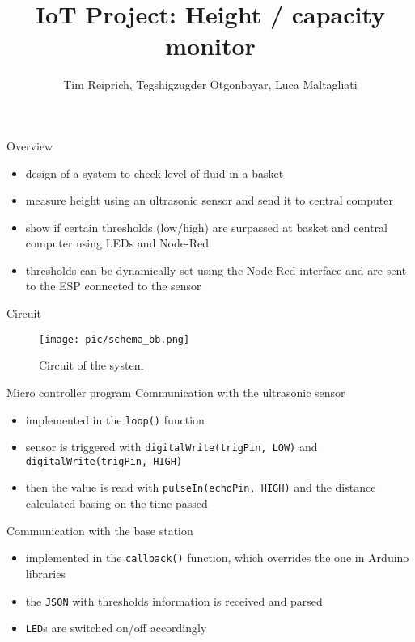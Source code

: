 \documentclass[11pt]{beamer}
\author{Tim Reiprich, Tegshigzugder Otgonbayar, Luca Maltagliati}
\title{IoT Project: Height / capacity monitor}
\begin{document}
\begin{frame}
\titlepage
\end{frame}



\begin{frame}{Overview}
\begin{itemize}
\item design of a system to check level of fluid in a basket
\item measure height using an ultrasonic sensor and send it to central computer
\item show if certain thresholds (low/high) are surpassed at basket and central computer using LEDs and Node-Red
\item thresholds can be dynamically set using the Node-Red interface and are sent to the ESP connected to the sensor
\end{itemize}
\end{frame}

\begin{frame}{Circuit}
\begin{figure}
\hspace*{-0.5cm}\texttt{[image: pic/schema\_bb.png]}
\caption{Circuit of the system}
\label{schema_bb}
\end{figure}
\end{frame}

\begin{frame}{Micro controller program}
  Communication with the ultrasonic sensor
  \begin{itemize}
  \item implemented in the \texttt{loop()} function
  \item sensor is triggered with \texttt{digitalWrite(trigPin, LOW)} and
    \texttt{digitalWrite(trigPin, HIGH)}
  \item then the value is read with \texttt{pulseIn(echoPin, HIGH)} and the distance
    calculated basing on the time passed
  \end{itemize}
  Communication with the base station
  \begin{itemize}
    \item implemented in the \texttt{callback()} function, which overrides the
      one in Arduino libraries
    \item the \texttt{JSON} with thresholds information is received and parsed
    \item \texttt{LED}s are switched on/off accordingly
  \end{itemize}
\end{frame}
\end{document}
